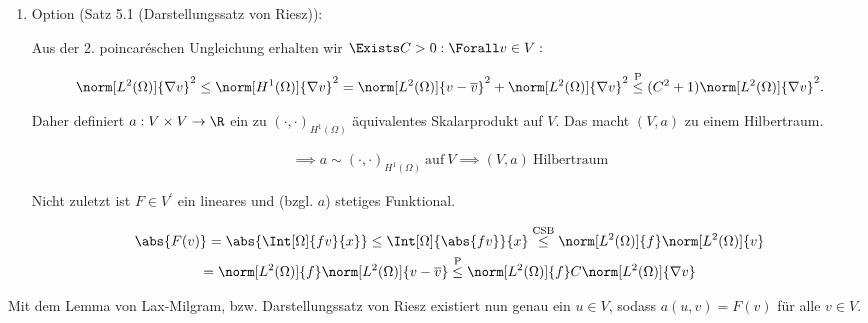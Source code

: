 \begin{solution}
\begin{enumerate}[label = \alph*)]
\begin{enumerate}[label = \arabic*.]
\begin{itemize}
        \end{itemize}

        \item Option (Satz 5.1 (Darstellungssatz von Riesz)):

        Aus der 2. poincaréschen Ungleichung erhalten wir $\Exists C > 0: \Forall v \in V:$

        \begin{align*}
            \norm[L^2(\Omega)]{\nabla v}^2
            \leq
            \norm[H^1(\Omega)]{\nabla v}^2
            =
            \norm[L^2(\Omega)]{v - \overline{v}}^2 + \norm[L^2(\Omega)]{\nabla v}^2
            \stackrel
            {
                \mathrm{P}
            }{\leq}
            (C^2 + 1) \norm[L^2(\Omega)]{\nabla v}^2.
        \end{align*}

        Daher definiert $a: V \times V \to \R$ ein zu $(\cdot, \cdot)_{H^1(\Omega)}$ äquivalentes Skalarprodukt auf $V$.
        Das macht $(V, a)$ zu einem Hilbertraum.

        \begin{align*}
            \implies
            a \sim (\cdot, \cdot)_{H^1(\Omega)} ~\text{auf}~ V
            \implies
            (V, a) ~\text{Hilbertraum}
        \end{align*}

        Nicht zuletzt ist $F \in V^\prime$ ein lineares und (bzgl. $a$) stetiges Funktional.

        \begin{multline*}
            \abs{F(v)}
            =
            \abs{\Int[\Omega]{f v}{x}}
            \leq
            \Int[\Omega]{\abs{f v}}{x}
            \stackrel
            {
                \mathrm{CSB}
            }{\leq}
            \norm[L^2(\Omega)]{f} \norm[L^2(\Omega)]{v} \\
            =
            \norm[L^2(\Omega)]{f} \norm[L^2(\Omega)]{v - \overline{v}}
            \stackrel
            {
                \mathrm{P}
            }{\leq}
            \norm[L^2(\Omega)]{f} C \norm[L^2(\Omega)]{\nabla v}
        \end{multline*}

    \end{enumerate}

    Mit dem Lemma von Lax-Milgram, bzw. Darstellungssatz von Riesz existiert nun genau ein $u \in V$, sodass $a(u, v) = F(v)$ für alle $v \in V$.


\end{enumerate}
\end{solution}

